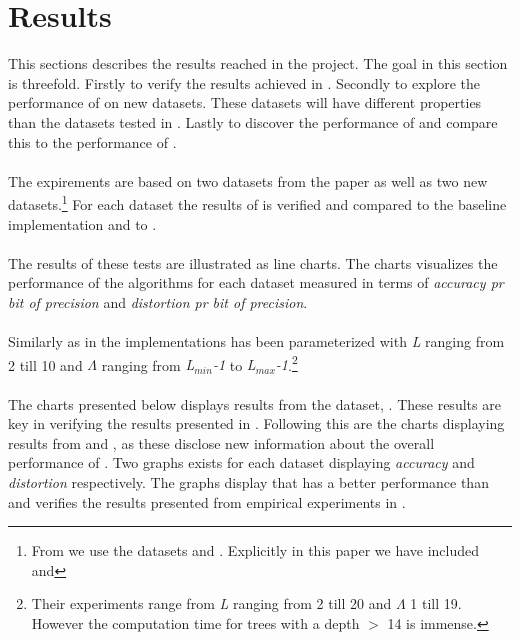 \section{Results}
\label{results}
This sections describes the results reached in the project. The goal in this section is threefold. Firstly to verify the results achieved in \cite{wagner17}. Secondly to explore the performance of \qs{} on new datasets. These datasets will have different properties than the datasets tested in \cite{wagner17}. Lastly to discover the performance of \qsr{} and compare this to the performance of \qs{}. 
\\
\\
The expirements are based on two datasets from the paper as well as two new datasets.\footnote{From \cite{wagner17} we use the datasets \sift{} and \mnist{}. Explicitly in this paper we have included \clust{} and \gist{}} For each dataset the results of \qs{} is verified and compared to the baseline implementation \gr{} and to \qsr{}. 
\\
\\
The results of these tests are illustrated as line charts. The charts visualizes the performance of the algorithms for each dataset measured in terms of \textit{accuracy pr bit of precision} and \textit{distortion pr bit of precision}. 
\\
\\
Similarly as in \cite{wagner17} the \qs{} implementations has been parameterized with \textit{L} ranging from 2 till 10 and $\Lambda$ ranging from \textit{L$_{min}$-1} to \textit{L$_{max}$-1}.\footnote{Their experiments range from \textit{L} ranging from 2 till 20 and $\Lambda$ 1 till 19. However the computation time for trees with a depth $>$ 14 is immense.} 
\\
\\
The charts presented below displays results from the dataset\sift{}, \mnist{}. These results are key in verifying the results presented in \cite{wagner17}. Following this are the charts displaying results from \clust{} and \gist{}, as these disclose new information about the overall performance of \qs{}. Two graphs exists for each dataset displaying \textit{accuracy} and \textit{distortion} respectively. The graphs display that \qs{} has a better performance than \grid{} and verifies the results presented from empirical experiments in \cite{wagner17}.

